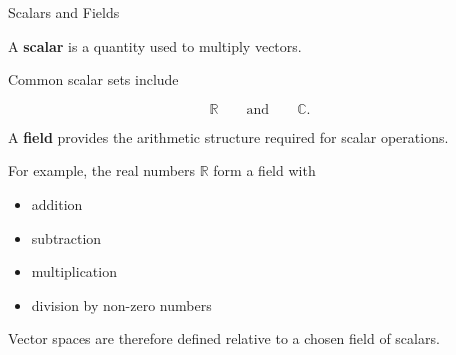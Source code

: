 \begin{frame}{Scalars and Fields}

A \textbf{scalar} is a quantity used to multiply vectors.

Common scalar sets include

\[
\mathbb{R}
\qquad\text{and}\qquad
\mathbb{C}.
\]

\vspace{0.4cm}

A \textbf{field} provides the arithmetic structure required
for scalar operations.

\vspace{0.4cm}

For example, the real numbers $\mathbb{R}$ form a field with

\begin{itemize}
    \item addition
    \item subtraction
    \item multiplication
    \item division by non-zero numbers
\end{itemize}

\vspace{0.2cm}

Vector spaces are therefore defined relative to a chosen
field of scalars.

\end{frame}




